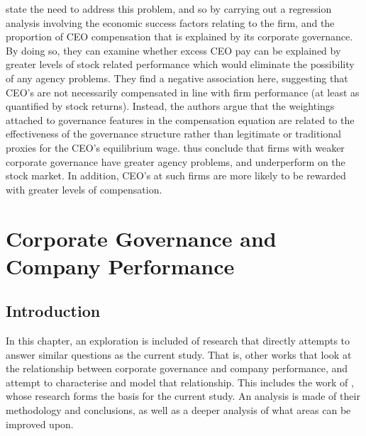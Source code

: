 {\cite{coreCompensation} state the need to address this problem, and so by carrying out a regression analysis involving the economic success factors relating to the firm, and the proportion of CEO compensation that is explained by its corporate governance. By doing so, they can examine whether excess CEO pay can be explained by greater levels of stock related performance which would eliminate the possibility of any agency problems. They find a negative association here, suggesting that CEO's are not necessarily compensated in line with firm performance (at least as quantified by stock returns). Instead, the authors argue that the weightings attached to governance features in the compensation equation are related to the effectiveness of the governance structure rather than legitimate or traditional proxies for the CEO's equilibrium wage. \cite{coreCompensation} thus conclude that firms with weaker corporate governance have greater agency problems, and underperform on the stock market. In addition, CEO's at such firms are more likely to be rewarded with greater levels of compensation.  
\section{Corporate Governance and Company Performance}
\subsection{Introduction}
{In this chapter, an exploration is included of research that directly attempts to answer similar questions as the current study. That is, other works that look at the relationship between corporate governance and company performance, and attempt to characterise and model that relationship. This includes the work of \cite{moldovan2015learning}, whose research forms the basis for the current study. An analysis is made of their methodology and conclusions, as well as a deeper analysis of what areas can be improved upon.}
}
